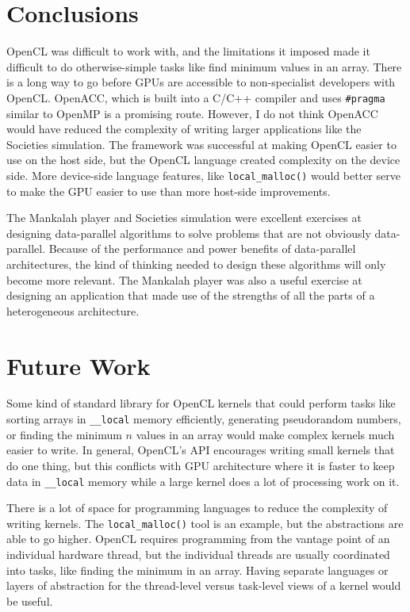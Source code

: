 \documentclass{article}
\begin{document}
\section{Conclusions}
OpenCL was difficult to work with, and the limitations it imposed made it difficult to do otherwise-simple tasks like find minimum values in an array. There is a long way to go before GPUs are accessible to non-specialist developers with OpenCL. OpenACC, which is built into a C/C++ compiler and uses \texttt{\#pragma} similar to OpenMP is a promising route. However, I do not think OpenACC would have reduced the complexity of writing larger applications like the Societies simulation. The framework was successful at making OpenCL easier to use on the host side, but the OpenCL language created complexity on the device side. More device-side language features, like \texttt{local\_malloc()} would better serve to make the GPU easier to use than more host-side improvements.

The Mankalah player and Societies simulation were excellent exercises at designing data-parallel algorithms to solve problems that are not obviously data-parallel. Because of the performance and power benefits of data-parallel architectures, the kind of thinking needed to design these algorithms will only become more relevant. The Mankalah player was also a useful exercise at designing an application that made use of the strengths of all the parts of a heterogeneous architecture. 

\section{Future Work}
Some kind of standard library for OpenCL kernels that could perform tasks like sorting arrays in \texttt{\_\_local} memory efficiently, generating pseudorandom numbers, or finding the minimum $n$ values in an array would make complex kernels much easier to write. In general, OpenCL's API encourages writing small kernels that do one thing, but this conflicts with GPU architecture where it is faster to keep data in \texttt{\_\_local} memory while a large kernel does a lot of processing work on it.

There is a lot of space for programming languages to reduce the complexity of writing kernels. The \texttt{local\_malloc()} tool is an example, but the abstractions are able to go higher. OpenCL requires programming from the vantage point of an individual hardware thread, but the individual threads are usually coordinated into tasks, like finding the minimum in an array. Having separate languages or layers of abstraction for the thread-level versus task-level views of a kernel would be useful.



\end{document}
